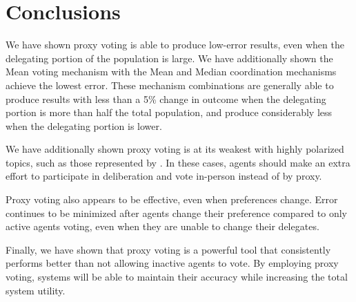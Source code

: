 \section{Conclusions}\label{sec:conclusions}
We have shown proxy voting is able to produce low-error results, even when the
delegating portion of the population is large.
We have additionally shown the Mean voting mechanism with the Mean and Median
coordination mechanisms achieve the lowest error.
These mechanism combinations are generally able to produce results with less than a 5\%
change in outcome when the delegating portion is more than half the total
population, and produce considerably less when the delegating portion is lower.

We have additionally shown proxy voting is at its weakest with highly polarized
topics, such as those represented by .
In these cases, agents should make an extra effort to participate in deliberation and
vote in-person instead of by proxy.

Proxy voting also appears to be effective, even when preferences change.
Error continues to be minimized after agents change their preference compared to only
active agents voting, even when they are unable to change their delegates.

Finally, we have shown that proxy voting is a powerful tool that consistently
performs better than not allowing inactive agents to vote.
By employing proxy voting, systems will be able to maintain their accuracy while
increasing the total system utility.


